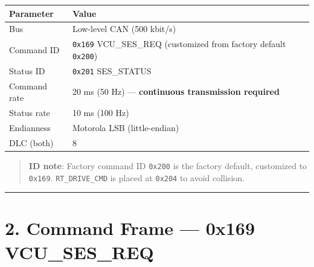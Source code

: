 \documentclass[12pt,a4paper,oneside]{report}
\begin{document}
\begin{longtable}[]{@{}ll@{}}
\toprule\noalign{}
Parameter & Value \\
\midrule\noalign{}
\endhead
\bottomrule\noalign{}
\endlastfoot
Bus & Low-level CAN (500 kbit/s) \\
Command ID & \texttt{0x169} VCU\_SES\_REQ (customized from factory default
\texttt{0x200}) \\
Status ID & \texttt{0x201} SES\_STATUS \\
Command rate & 20 ms (50 Hz) --- \textbf{continuous transmission required} \\
Status rate & 10 ms (100 Hz) \\
Endianness & Motorola LSB (little-endian) \\
DLC (both) & 8 \\
\end{longtable}

\begin{quote}
\textbf{ID note}: Factory command ID \texttt{0x200} is the factory default,
customized to \texttt{0x169}. \texttt{RT\_DRIVE\_CMD} is placed at
\texttt{0x204} to avoid collision.
\end{quote}

\begin{center}\rule{0.5\linewidth}{0.5pt}\end{center}

\section{2. Command Frame --- 0x169
VCU\_SES\_REQ}\label{command-frame-0x169-vcu_ses_req}
\end{document}
